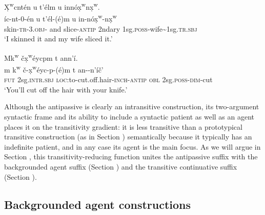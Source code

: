 \documentclass[output=paper,colorlinks,citecolor=brown]{langscibook}
\begin{document}
\ea 
\label{ex-thomason-16}
{\d{X}\textsuperscript w}cnt\'en u t'\'elm {\textltilde}u inn\'o{\d{x}\textsuperscript w}n{\d{x}\textsuperscript w}.  \\
\'ic-nt-0-\'en u t'\'el-(\'e)m
{\textltilde}u in-n\'o{\d{x}\textsuperscript w}-n{\d{x}\textsuperscript w} \\
skin-\textsc{tr}-3.\textsc{obj}- and slice-\textsc{antip} 2ndary 1sg.\textsc{poss}-wife\textasciitilde{}1sg.\textsc{tr.sbj} \\
\glt `I skinned it and my wife sliced it.'
\z

\ea 
\label{ex-thomason-17}
Mk\textsuperscript w \v{c}\d{x}\textsuperscript w\'eycpm t an{\textltilde}n'\'i. \\
 \gll m k{\textsuperscript w} \v{c}-\d{x}{\textsuperscript w}\'eyc-p-(\'e)m t
an-\textltilde-n'\'i\v{c}'\\ 
\textsc{fut} 2sg.\textsc{intr.sbj} \textsc{loc:}to-cut.off.hair-\textsc{inch}-\textsc{antip} \textsc{obl} 2sg.\textsc{poss}-\textsc{dim}-cut\\
 \glt `You'll cut off the hair with your knife.'
 \z


Although the antipassive is clearly an intransitive construction, its
two-argument syntactic frame and its ability to include a syntactic
patient as well as an agent places it on the transitivity gradient: it
is less transitive than a prototypical transitive construction (as in
Section ) semantically because it typically has an indefinite patient,
and in any case its agent is the main focus.  As we will argue in Section , this transitivity-reducing function unites the antipassive suffix
with the backgrounded agent suffix (Section ) and the transitive
continuative suffix (Section ).

\subsection{Backgrounded agent constructions} %
\label{thomason_section_2.5}
\end{document}
